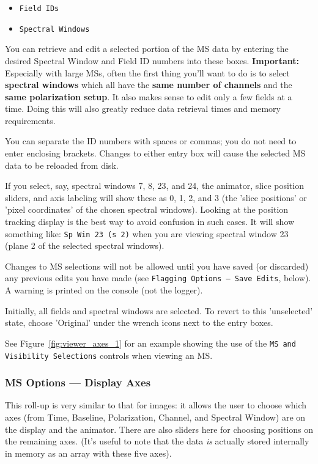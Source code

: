 \begin{itemize}

\item {\tt Field IDs}

\item {\tt Spectral Windows}

\end{itemize}

You can retrieve and edit a selected portion of the MS data
by entering the desired Spectral Window and Field ID numbers into
these boxes.  {\bf Important:} Especially with large MSs, often the
first thing you'll want to do is to select {\bf spectral windows}
which all have the {\bf same number of channels} and the
{\bf same polarization setup}.  It also makes sense to edit only
a few fields at a time.   Doing this will also
greatly reduce data retrieval times and memory requirements.

You can separate the ID numbers with spaces or commas; you do not need to
enter enclosing brackets.  Changes to either entry box will cause
the selected MS data to be reloaded from disk.

If you select, say, spectral windows 7, 8, 23, and 24, the animator, slice
position sliders, and axis labeling will show 
these as 0, 1, 2, and 3 (the 'slice positions' or 'pixel coordinates' of the
chosen spectral windows).  Looking at the position tracking display is the best
way to avoid confusion in such cases.  It will show something like: 
{\tt Sp Win 23 (s 2)} when you are viewing spectral window 23 (plane 2
of the selected spectral windows).

Changes to MS selections will not be allowed until you have saved
(or discarded) any previous edits you have made (see {\tt Flagging Options 
-- Save Edits}, below).  A warning is printed on the console (not the logger).

Initially, all fields and spectral windows are selected.  To revert to
this 'unselected' state, choose 'Original' under the wrench
icons next to the entry boxes.

See Figure~\ref{fig:viewer_axes_1} for an example showing the use
of the {\tt MS and Visibility Selections} controls when 
viewing an MS.

\subsubsection{MS Options --- Display Axes}
\label{section:display.ms.adjust.axes}

This roll-up is very similar to that for images: it allows the user to
choose which axes (from Time, Baseline, Polarization, Channel, and
Spectral Window) are on the display and the animator.  There are
also sliders here for choosing positions on the remaining axes.  (It's 
useful to note that the data {\it is} actually stored internally in
memory as an array with these five axes).

